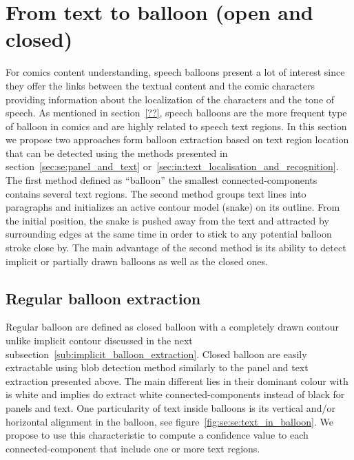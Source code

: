 \section{From text to balloon (open and closed)} %
\label{sec:from_text_to_balloon_}
For comics content understanding, speech balloons present a lot of interest since they offer the links between the textual content and the comic characters providing information about the localization of the characters and the tone of speech. 
As mentioned in section~\ref{??}, speech balloons are the more frequent type of balloon in comics and are highly related to speech text regions.
In this section we propose two approaches form balloon extraction based on text region location that can be detected using the methods presented in section~\ref{sec:se:panel_and_text} or~\ref{sec:in:text_localisation_and_recognition}.
The first method defined as ``balloon'' the smallest connected-components contains several text regions.
The second method groups text lines into paragraphs and initializes an active contour model (snake) on its outline.
From the initial position, the snake is pushed away from the text and attracted by surrounding edges at the same time in order to stick to any potential balloon stroke close by.
The main advantage of the second method is its ability to detect implicit or partially drawn balloons as well as the closed ones.

\subsection{Regular balloon extraction} %
\label{sub:regular_balloon_extraction}
Regular balloon are defined as closed balloon with a completely drawn contour unlike implicit contour discussed in the next subsection~\ref{sub:implicit_balloon_extraction}.
Closed balloon are easily extractable using blob detection method similarly to the panel and text extraction presented above.
The main different lies in their dominant colour with is white and implies do extract white connected-components instead of black for panels and text.
One particularity of text inside balloons is its vertical and/or horizontal alignment in the balloon, see figure~\ref{fig:se:se:text_in_balloon}.
We propose to use this characteristic to compute a confidence value to each connected-component that include one or more text regions.

